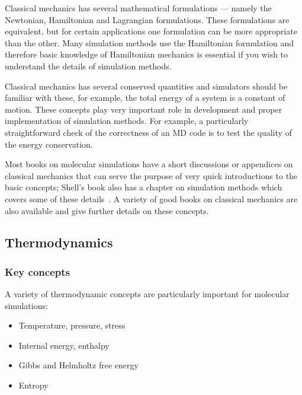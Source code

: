 \documentclass[9pt,bestpractices]{livecoms}
\begin{document}
Classical mechanics has several mathematical formulations --- namely the Newtonian, Hamiltonian and Lagrangian formulations.
These formulations are equivalent, but for certain applications one formulation can be more appropriate than the other. 
Many simulation methods use the Hamiltonian formulation and therefore basic knowledge of Hamiltonian mechanics is essential if you wish to understand the details of simulation methods.

Classical mechanics has several conserved quantities and simulators should be familiar with these, for example, the total energy of a system is a constant of motion.
These concepts play very important role in development and proper implementation of simulation methods.
For example, a particularly straightforward check of the correctness of an MD code is to test the quality of the energy conservation.

Most books on molecular simulations have a short discussions or appendices on classical mechanics that can serve the purpose of very quick introductions to the basic concepts; Shell's book also has a chapter on simulation methods which covers some of these details~\cite{ShellBook}.
A variety of good books on classical mechanics are also available and give further details on these concepts.

\subsection{Thermodynamics}
\label{sec:thermodynamics}

\subsubsection{Key concepts}
A variety of thermodynamic concepts are particularly important for molecular simulations:
\begin{itemize}
\item Temperature, pressure, stress
\item Internal energy, enthalpy
\item Gibbs and Helmholtz free energy
\item Entropy
\end{itemize}
\end{document}
